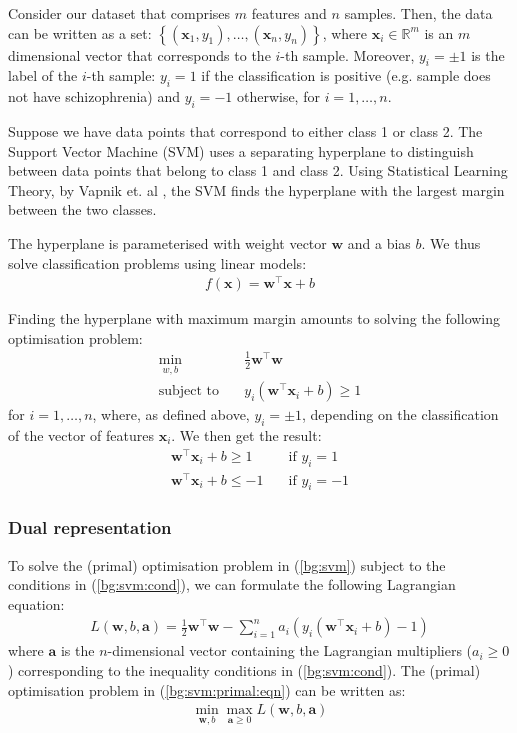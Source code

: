 \documentclass[12pt, twoside, a4paper]{article}
\def\vec{\boldsymbol}
\begin{document}
Consider our dataset that comprises $m$ features and $n$ samples. Then, the data can be written as a set: $\left\lbrace (\boldsymbol{x}_1, y_1), \dots, (\boldsymbol{x}_n, y_n) \right\rbrace$, where $\boldsymbol{x}_i \in \mathbb{R}^m$ is an $m$ dimensional vector that corresponds to the $i$-th sample. Moreover, $y_i = \pm 1$ is the label of the $i$-th sample: $y_i = 1$ if the classification is positive (e.g. sample does not have schizophrenia) and $y_i = -1$ otherwise, for $i = 1, \dots , n$.

Suppose we have data points that correspond to either class 1 or class 2. The Support Vector Machine (SVM) \cite{RefWorks:122} uses a separating hyperplane to distinguish between data points that belong to class 1 and class 2. Using Statistical Learning Theory, by Vapnik et. al \cite{RefWorks:122}, the SVM finds the hyperplane with the largest margin between the two classes.

The hyperplane is parameterised with weight vector $\boldsymbol w$ and a bias $b$. We thus solve classification problems using linear models:
\begin{align}
f(\vec{x}) = \vec{w}^\top \vec{x} + b \label{bg:svm:linear_model}
\end{align}

Finding the hyperplane with maximum margin amounts to solving the following optimisation problem:
\begin{align}
\min_{w, b} \quad &\frac{1}{2} \boldsymbol w^\top \boldsymbol w \label{bg:svm} \\
\text{subject to} \quad & y_i(\boldsymbol w^\top \boldsymbol x_i + b) \geq 1 \label{bg:svm:cond} 
\end{align}
for $i = 1, \dots , n$, where, as defined above, $y_i = \pm 1$, depending on the classification of the vector of features $\boldsymbol x_i$. We then get the result:
\begin{align*}
\boldsymbol w^\top \boldsymbol x_i + b \geq 1 \quad &\text{if $y_i = 1$} \\
\boldsymbol w^\top \boldsymbol x_i + b \leq -1 \quad &\text{if $y_i = -1$}
\end{align*}

\subsubsection{Dual representation}
To solve the (primal) optimisation problem in (\ref{bg:svm}) subject to the conditions in (\ref{bg:svm:cond}), we can formulate the following Lagrangian equation:
\begin{align}
L(\boldsymbol w, b, \boldsymbol a)
= \frac{1}{2} \boldsymbol w^\top \boldsymbol w - \sum_{i=1}^n a_i (y_i(\boldsymbol w^\top \boldsymbol x_i + b) - 1) \label{bg:svm:primal:eqn}
\end{align}
where $\boldsymbol a$ is the $n$-dimensional vector containing the Lagrangian multipliers ($a_i \geq 0$) corresponding to the inequality conditions in (\ref{bg:svm:cond}). The (primal) optimisation problem in (\ref{bg:svm:primal:eqn}) can be written as:
\begin{align}
\min_{\boldsymbol w, b} \max_{\boldsymbol a \geq 0} L(\boldsymbol w, b, \vec a) \label{bg:svm:primal}
\end{align}
\end{document}
